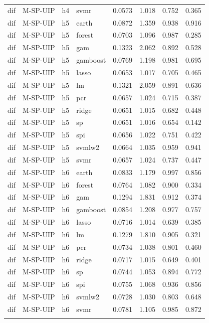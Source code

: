 \begin{ThreePartTable}
\begin{longtable}[t]{llclcccc}
dif & M-SP-UIP & h4 & svmr & 0.0573 & 1.018 & 0.752 & 0.365\\
\addlinespace
dif & M-SP-UIP & h5 & earth & 0.0872 & 1.359 & 0.938 & 0.916\\
dif & M-SP-UIP & h5 & forest & 0.0703 & 1.096 & 0.987 & 0.285\\
dif & M-SP-UIP & h5 & gam & 0.1323 & 2.062 & 0.892 & 0.528\\
dif & M-SP-UIP & h5 & gamboost & 0.0769 & 1.198 & 0.981 & 0.695\\
dif & M-SP-UIP & h5 & lasso & 0.0653 & 1.017 & 0.705 & 0.465\\
dif & M-SP-UIP & h5 & lm & 0.1321 & 2.059 & 0.891 & 0.636\\
dif & M-SP-UIP & h5 & pcr & 0.0657 & 1.024 & 0.715 & 0.387\\
dif & M-SP-UIP & h5 & ridge & 0.0651 & 1.015 & 0.682 & 0.448\\
dif & M-SP-UIP & h5 & sp & 0.0651 & 1.016 & 0.654 & 0.142\\
dif & M-SP-UIP & h5 & spi & 0.0656 & 1.022 & 0.751 & 0.422\\
dif & M-SP-UIP & h5 & svmlw2 & 0.0664 & 1.035 & 0.959 & 0.941\\
dif & M-SP-UIP & h5 & svmr & 0.0657 & 1.024 & 0.737 & 0.447\\
\addlinespace
dif & M-SP-UIP & h6 & earth & 0.0833 & 1.179 & 0.997 & 0.856\\
dif & M-SP-UIP & h6 & forest & 0.0764 & 1.082 & 0.900 & 0.334\\
dif & M-SP-UIP & h6 & gam & 0.1294 & 1.831 & 0.912 & 0.374\\
dif & M-SP-UIP & h6 & gamboost & 0.0854 & 1.208 & 0.977 & 0.757\\
dif & M-SP-UIP & h6 & lasso & 0.0716 & 1.014 & 0.639 & 0.385\\
dif & M-SP-UIP & h6 & lm & 0.1279 & 1.810 & 0.905 & 0.321\\
dif & M-SP-UIP & h6 & pcr & 0.0734 & 1.038 & 0.801 & 0.460\\
dif & M-SP-UIP & h6 & ridge & 0.0717 & 1.015 & 0.649 & 0.401\\
dif & M-SP-UIP & h6 & sp & 0.0744 & 1.053 & 0.894 & 0.772\\
dif & M-SP-UIP & h6 & spi & 0.0755 & 1.068 & 0.936 & 0.856\\
dif & M-SP-UIP & h6 & svmlw2 & 0.0728 & 1.030 & 0.803 & 0.648\\
dif & M-SP-UIP & h6 & svmr & 0.0781 & 1.105 & 0.985 & 0.872\\
\addlinespace

\end{longtable}
\end{ThreePartTable}
